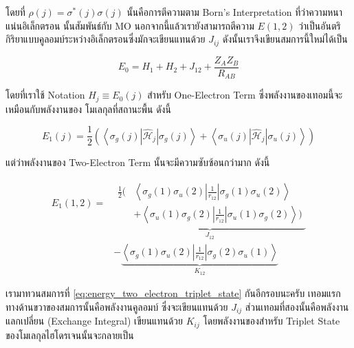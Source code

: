 \noindent โดยที่ $\rho(j) = \sigma^*(j) \sigma(j)$ นั้นคือการตีความตาม Born's Interpretation ที่ว่าความหนาแน่นอิเล็กตรอน%
นั้นสัมพันธ์กับ MO นอกจากนี้แล้วเรายังสามารถตีความ $E(1,2)$ ว่าเป็นอันตริกิริยาแบบคูลอมบ์ระหว่างอิเล็กตรอนซึ่งมักจะเขียนแทนด้วย $J_{i j}$
ดังนั้นเราจึงเขียนสมการนี้ใหม่ได้เป็น

\begin{equation}
    E_0
    =
    H_1 + H_2 + J_{12} + \frac{Z_A Z_B}{R_{A B}}
\end{equation}

\noindent โดยที่เราใช้ Notation $H_j \equiv E_0(j)$ สำหรับ One-Electron Term ซึ่งพลังงานของเทอมนี้จะเหมือนกับพลังงานของ%
โมเลกุลที่สถานะพื้น ดังนี้

\begin{equation}
    \label{eq:energy_one_electron_triplet_state}
    E_1(j)
    =
    \frac{1}{2}
    \left(
    \left\langle
    \sigma_g(j)\left|\hat{\mathscr{H}}_j\right| \sigma_g(j)
    \right\rangle
    +
    \left\langle
    \sigma_u(j)\left|\hat{\mathscr{H}}_j\right| \sigma_u(j)
    \right\rangle
    \right)
\end{equation}

\noindent แต่ว่าพลังงานของ Two-Electron Term นั้นจะมีความซับซ้อนกว่ามาก ดังนี้

\begin{equation}
    \label{eq:energy_two_electron_triplet_state}
    \begin{aligned}
        E_1(1,2)
        = &
        \underbrace{
            \begin{aligned}
                \frac{1}{2}
                \biggl(
                 & \left\langle\sigma_g(1) \sigma_u(2)
                \left|\frac{1}{r_{12}}\right|
                \sigma_g(1) \sigma_u(2)\right\rangle     \\
                 & + \left\langle\sigma_u(1) \sigma_g(2)
                \left|\frac{1}{r_{12}}\right|
                \sigma_u(1) \sigma_g(2)\right\rangle
                \biggl)
            \end{aligned}
        }_{J_{12}}        \\
          & -\underbrace{
            \left\langle\sigma_g(1) \sigma_u(2)
            \left|\frac{1}{r_{12}}\right|
            \sigma_g(2) \sigma_u(1)\right\rangle}
        _{K_{12}}
    \end{aligned}
\end{equation}

เรามาทวนสมการที่ \eqref{eq:energy_two_electron_triplet_state} กันอีกรอบนะครับ เทอมแรกทางด้านขวาของสมการนั้นคือพลังงานคูลอมบ์%
ซึ่งจะเขียนแทนด้วย $J_{i j}$ ส่วนเทอมที่สองนั้นคือพลังงานแลกเปลี่ยน (Exchange Integral) เขียนแทนด้วย $K_{i j}$ โดยพลังงานของสำหรับ
Triplet State ของโมเลกุลไฮโดรเจนนั้นจะกลายเป็น

